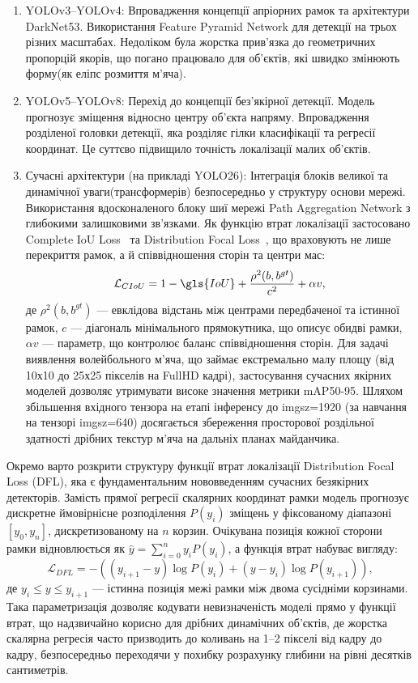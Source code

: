 \begin{enumerate}
    \item YOLOv3–YOLOv4: Впровадження концепції апріорних рамок та архітектури DarkNet53. Використання
    Feature Pyramid Network для детекції на трьох різних
    масштабах. Недоліком була жорстка прив'язка до геометричних
    пропорцій якорів, що погано працювало для об'єктів, які швидко
    змінюють форму(як еліпс розмиття м'яча).
    \item YOLOv5–YOLOv8: Перехід до концепції без'якірної
    детекції. Модель прогнозує зміщення відносно центру об'єкта
    напряму. Впровадження розділеної головки детекції, яка розділяє гілки класифікації та регресії координат. Це
    суттєво підвищило точність локалізації малих об'єктів.
    \item Сучасні архітектури (на прикладі YOLO26): Інтеграція блоків
    великої та динамічної уваги(трансформерів)
    безпосередньо у структуру основи мережі.
    Використання вдосконаленого блоку шиї мережі Path Aggregation
    Network з глибокими залишковими зв'язками. Як функцію
    втрат локалізації застосовано Complete \gls{IoU} Loss~\cite{zheng_ciou} та
    Distribution Focal Loss~\cite{li_gfl}, що враховують не лише перекриття
    рамок, а й співвідношення сторін та центри мас:
    \begin{equation}\mathcal{L}_{CIoU} = 1 - \gls{IoU} + \frac{\rho^2(b, b^{gt})}{c^2} + \alpha v, \end{equation}
    де $\rho^2(b, b^{gt})$ — евклідова відстань між центрами передбаченої та
    істинної рамок, $c$ — діагональ мінімального прямокутника, що описує обидві
    рамки, $\alpha v$ — параметр, що контролює баланс співвідношення сторін.
    Для задачі виявлення волейбольного м'яча, що займає екстремально малу
    площу (від 10х10 до 25х25 пікселів на FullHD кадрі), застосування сучасних
    якірних моделей дозволяє утримувати високе значення метрики mAP50-95.
    Шляхом збільшення вхідного тензора на етапі інференсу до imgsz=1920 (за
    навчання на тензорі imgsz=640) досягається збереження просторової роздільної
    здатності дрібних текстур м'яча на дальніх планах майданчика.
\end{enumerate}

Окремо варто розкрити структуру функції втрат локалізації Distribution Focal Loss (DFL),
яка є фундаментальним нововведенням сучасних безякірних детекторів. Замість прямої регресії
скалярних координат рамки модель прогнозує дискретне ймовірнісне розподілення $P(y_i)$ зміщень
у фіксованому діапазоні $[y_0, y_n]$, дискретизованому на $n$ корзин. Очікувана позиція кожної
сторони рамки відновлюється як $\hat{y} = \sum_{i=0}^{n}y_i P(y_i)$, а функція втрат набуває
вигляду:
\begin{equation}\mathcal{L}_{DFL} = -\left( (y_{i+1} - y) \log P(y_i) + (y - y_i) \log P(y_{i+1}) \right),\end{equation}
де $y_i \leq y \leq y_{i+1}$ --- істинна позиція межі рамки між двома сусідніми корзинами.
Така параметризація дозволяє кодувати невизначеність моделі прямо у функції втрат, що
надзвичайно корисно для дрібних динамічних об'єктів, де
жорстка скалярна регресія часто
призводить до коливань на 1--2 пікселі від кадру до кадру, безпосередньо переходячи у похибку
розрахунку глибини на рівні десятків сантиметрів.


